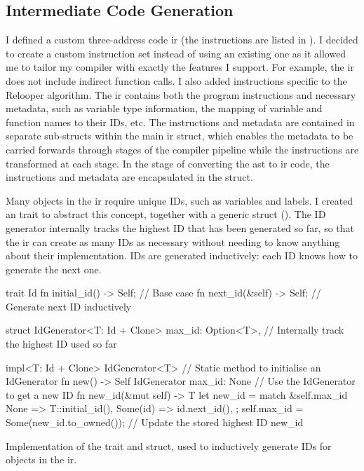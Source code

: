 \documentclass[00-main.tex]{subfiles}
\begin{document}
\subsection{Intermediate Code Generation}

I defined a custom three-address code \gls{ir} (the instructions are listed in ).
I decided to create a custom instruction set instead of using an existing one as it allowed me to tailor my compiler with exactly the features I support. For example, the \gls{ir} does not include indirect function calls.
I also added instructions specific to the Relooper algorithm.
The \gls{ir} contains both the program instructions and necessary metadata, such as variable type information, the mapping of variable and function names to their IDs, etc.
The instructions and metadata are contained in separate sub-structs within the main \gls{ir} struct, which enables the metadata to be carried forwards through stages of the compiler pipeline while the instructions are transformed at each stage.
In the stage of converting the \gls{ast} to \gls{ir} code, the instructions and metadata are encapsulated in the  struct.

Many objects in the \gls{ir} require unique IDs, such as variables and labels.
I created an  trait to abstract this concept, together with a generic  struct ().
The ID generator internally tracks the highest ID that has been generated so far, so that the \gls{ir} can create as many IDs as necessary without needing to know anything about their implementation.
IDs are generated inductively: each ID knows how to generate the next one.

\begin{listing}[t]
  \begin{RustListing}
    trait Id {
        fn initial_id() -> Self;   // Base case
        fn next_id(&self) -> Self; // Generate next ID inductively
    }

    struct IdGenerator<T: Id + Clone> {
        max_id: Option<T>,         // Internally track the highest ID used so far
    }

    impl<T: Id + Clone> IdGenerator<T> {
        // Static method to initialise an IdGenerator
        fn new() -> Self {
            IdGenerator { max_id: None }
        }
        // Use the IdGenerator to get a new ID
        fn new_id(&mut self) -> T {
            let new_id = match &self.max_id {
                None => T::initial_id(),
                Some(id) => id.next_id(),
            };
            self.max_id = Some(new_id.to_owned()); // Update the stored highest ID
            new_id
        }
    }
  \end{RustListing}
  \caption{Implementation of the  trait and  struct, used to inductively generate IDs for objects in the \acrlong{ir}.}
  \label{lst:Id and IdGenerator implementation}
\end{listing}
\end{document}

